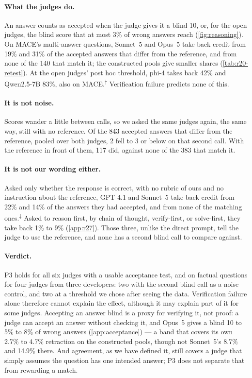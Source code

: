 \documentclass{article}
\newcommand{\reana}{\textsuperscript{$\ddagger$}}
\newcommand{\ph}{\textsuperscript{$\dagger$}}
\begin{document}
\paragraph{What the judges do.}
An answer counts as accepted when the judge gives it a blind 10, or, for the open judges, the blind score that at most 3\% of wrong answers reach (\cref{fig:reasoning}).
On \textsc{MACE}'s multi-answer questions, Sonnet~5 and Opus~5 take back credit from 19\% and 31\% of the accepted answers that differ from the reference, and from none of the 140 that match it; the constructed pools give smaller shares (\cref{tab:r20-retest}). At the open judges' post hoc threshold, phi-4 takes back 42\% and Qwen2.5-7B 83\%, also on \textsc{MACE}.\ph{}
Verification failure predicts none of this.

\paragraph{It is not noise.}
Scores wander a little between calls, so we asked the same judges again, the same way, still with no reference.
Of the 843 accepted answers that differ from the reference, pooled over both judges, 2 fell to 3 or below on that second call. With the reference in front of them, 117 did, against none of the 383 that match it.

\paragraph{It is not our wording either.}
Asked only whether the response is correct, with no rubric of ours and no instruction about the reference, GPT-4.1 and Sonnet~5 take back credit from 22\% and 14\% of the answers they had accepted, and from none of the matching ones.\reana{}
Asked to reason first, by chain of thought, verify-first, or solve-first, they take back 1\% to 9\% (\cref{app:r27}). Those three, unlike the direct prompt, tell the judge to use the reference, and none has a second blind call to compare against.

\paragraph{Verdict.}
P3 holds for all six judges with a usable acceptance test, and on factual questions for four judges from three developers: two with the second blind call as a noise control, and two at a threshold we chose after seeing the data.
Verification failure alone therefore cannot explain the effect, although it may explain part of it for some judges.
Accepting an answer blind is a proxy for verifying it, not proof: a judge can accept an answer without checking it, and Opus~5 gives a blind 10 to 5\% to 8\% of wrong answers (\cref{app:acceptance}) --- a band that covers its own 2.7\% to 4.7\% retraction on the constructed pools, though not Sonnet~5's 8.7\% and 14.9\% there.
And agreement, as we have defined it, still covers a judge that simply assumes the question has one intended answer; P3 does not separate that from rewarding a match.
\end{document}
